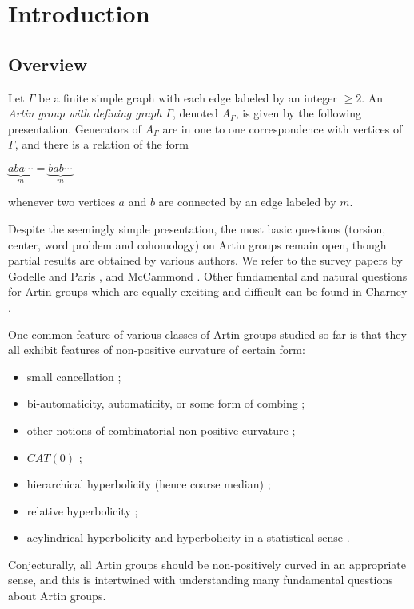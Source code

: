 \documentclass[11pt]{amsart}
\theoremstyle{definition}
\begin{document}
\maketitle

\setcounter{tocdepth}{2}
\tableofcontents


\section{Introduction}
\label{s:intro}
\subsection*{Overview}
Let $\Gamma$ be a finite simple graph with each edge labeled by an integer $\ge 2$. An \emph{Artin group with defining graph $\Gamma$}, denoted $A_\Gamma$, is given by the following presentation. Generators of $A_\Gamma$ are in one to one correspondence with vertices of $\Gamma$, and there is a relation of the form
\begin{center}
$\underbrace{aba\cdots}_{m}=\underbrace{bab\cdots}_{m}$
\end{center}
whenever two vertices $a$ and $b$ are connected by an edge labeled by $m$. 

Despite the seemingly simple presentation, the most basic questions (torsion, center, word problem and cohomology) on Artin groups remain open, though partial results are obtained by various authors. We refer to the survey papers by Godelle and Paris \cite{MR3203644}, and McCammond \cite{jonproblems}. Other fundamental and natural questions for Artin groups which are equally exciting and difficult can be found in Charney \cite{charney2016problems}.

One common feature of various classes of Artin groups studied so far is that they all exhibit features of non-positive curvature of certain form:
\begin{itemize}
	\item small cancellation \cite{AppelSchupp1983,Appel1984,Pride,Peifer};
	\item bi-automaticity, automaticity, or some form of combing \cite{Charney1992,MR1314589,charney2003k,MR2208796,holt2011artin,MR2985512,MR3351966};
	\item other notions of combinatorial non-positive curvature \cite{Bestvina1999,Artinsystolic};
	\item $CAT(0)$ \cite{charney1995k,BradyMcCammond2000,brady2002two,bell2005three,brady2010braids,haettel20166};
	\item hierarchical hyperbolicity (hence coarse median) \cite{CharneyCrispAutomorphism,MR3650081,gordon2004artin,behrstock2015hierarchically};
	\item relative hyperbolicity \cite{kapovich2004relative,charney2007relative};
	\item acylindrical hyperbolicity \cite{calvez2016acylindrical,charney2019artin} and hyperbolicity in a statistical sense \cite{cumplido2017loxodromic,yang2016statistically}.
\end{itemize}
Conjecturally, all Artin groups should be non-positively curved in an appropriate sense, and this is intertwined with understanding many fundamental questions about Artin groups.
\end{document}
